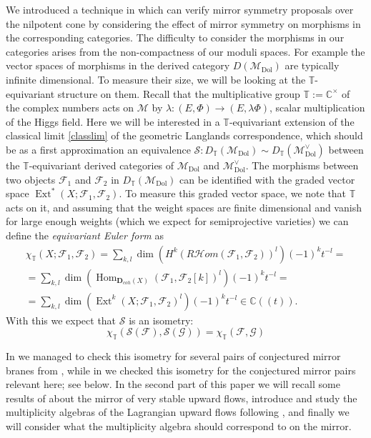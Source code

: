 \documentclass[12pt]{article}
\numberwithin{equation}{section}
\theoremstyle{remark}
\numberwithin{theorem}{section}
\DeclareMathOperator{\Hom}{Hom}
\DeclareMathOperator{\Ext}{Ext }
\def\C{\mathbb{C}}
\def\M{{\mathcal{M}}}
\def\calF{{\mathcal{F}}}
\newcommand{\T}{{\mathbb{T}}}
\def\calG{{\mathcal G}}
\newcommand{\Dol}{{\mathrm{Dol}}}
\numberwithin{equation}{section}
\begin{document}
We introduced a technique in \cite{hausel-mellit-pei,hausel-hitchin} which can verify mirror symmetry proposals over the nilpotent cone by considering the effect of mirror symmetry on morphisms in the corresponding categories. The difficulty to consider the morphisms in our categories arises from the non-compactness of our moduli spaces. For example the vector spaces of morphisms in the derived category $D(\M_\Dol)$ are typically infinite dimensional.  To measure their size, we will be looking at the $\T$-equivariant structure on them. Recall that the multiplicative group $\T:=\C^\times$ of the complex numbers acts on $\M$ by $\lambda:(E,\Phi)\to (E,\lambda\Phi)$, scalar multiplication of the Higgs field. Here we will be interested in a $\T$-equivariant extension of the classical limit \eqref{classlim} of the geometric Langlands correspondence, which should be as a first approximation an equivalence
$ \label{eqclasslim}\mathscr{S}:D_\T(\M_\Dol) \sim D_\T(\M^\vee_{\Dol})$ between the $\T$-equivariant derived categories of $\M_\Dol$ and $\M^\vee_{\Dol}$.  The morphisms between two objects $\calF_1$ and $\calF_2$ in $D_\T(\M_\Dol)$ can be identified with the graded vector space  $\Ext^*(X;\calF_1,\calF_2)$. To measure this graded vector space, we note that $\T$ acts on it, and assuming that the weight spaces are finite dimensional and vanish for large enough weights (which we expect for semiprojective varieties) 
we can define
the {\em equivariant Euler form} as \begin{multline*}\chi_\T(X;\calF_1,\calF_2)=\sum_{k,l} \dim(H^k({ R} {\mathcal Hom}(\calF_1,\calF_2))^l) (-1)^k t^{-l}=\\ =\sum_{k,l} \dim\left(\Hom_{{\mathbf D}_{coh}(X)}(\calF_1,\calF_2[k])^l\right) (-1)^k t^{-l}=\\=\sum_{k,l} \dim(\Ext^k(X;\calF_1,\calF_2)^l) (-1)^k t^{-l} \in \C((t)).\end{multline*}
With this we expect that $\mathscr{S}$ is an isometry: $$\chi_\T(\mathscr{S}(\calF),\mathscr{S}(\calG))=\chi_\T(\calF,\calG)$$

In \cite{hausel-mellit-pei} we  managed to check this isometry for several pairs of conjectured mirror branes from \cite{hitchin-characteristic}, while in \cite{hausel-hitchin} we checked this isometry for the conjectured mirror pairs relevant here; see below. In the second part of this paper we will recall some results of \cite{hausel-hitchin} about the mirror of very stable upward flows, introduce and study the multiplicity algebras of the Lagrangian upward flows following \cite{hausel-hitchin1}, and finally we will consider what the multiplicity algebra should correspond to on the mirror. 
\end{document}
